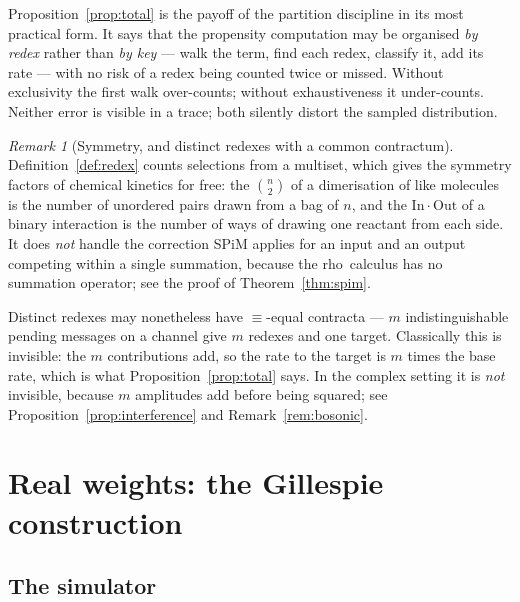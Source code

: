 \documentclass[11pt,a4paper]{article}
\theoremstyle{plain}
\theoremstyle{definition}
\theoremstyle{remark}
\newtheorem{remark}[theorem]{Remark}
\newcommand{\rhoc}{\textsf{rho}}
\begin{document}
Proposition~\ref{prop:total} is the payoff of the partition discipline in its most practical form.
It says that the propensity computation may be organised \emph{by redex} rather than \emph{by key} ---
walk the term, find each redex, classify it, add its rate --- with no risk of a redex being counted
twice or missed. Without exclusivity the first walk over-counts; without exhaustiveness it
under-counts. Neither error is visible in a trace; both silently distort the sampled distribution.

\begin{remark}[Symmetry, and distinct redexes with a common contractum]
\label{rem:distinct-contracta}
Definition~\ref{def:redex} counts selections from a multiset, which gives the symmetry factors of
chemical kinetics for free: the $\binom{n}{2}$ of a dimerisation of like molecules is the number of
unordered pairs drawn from a bag of $n$, and the $\mathrm{In}\cdot\mathrm{Out}$ of a binary
interaction is the number of ways of drawing one reactant from each side. It does \emph{not} handle
the correction SPiM applies for an input and an output competing within a single summation, because
the \rhoc\ calculus has no summation operator; see the proof of Theorem~\ref{thm:spim}.

Distinct redexes may nonetheless have $\equiv$-equal contracta --- $m$ indistinguishable pending
messages on a channel give $m$ redexes and one target. Classically this is invisible: the $m$
contributions add, so the rate to the target is $m$ times the base rate, which is what
Proposition~\ref{prop:total} says. In the complex setting it is \emph{not} invisible, because $m$
amplitudes add before being squared; see Proposition~\ref{prop:interference} and
Remark~\ref{rem:bosonic}.
\end{remark}

\section{Real weights: the Gillespie construction}
\label{sec:gillespie}

\subsection{The simulator}
\end{document}
